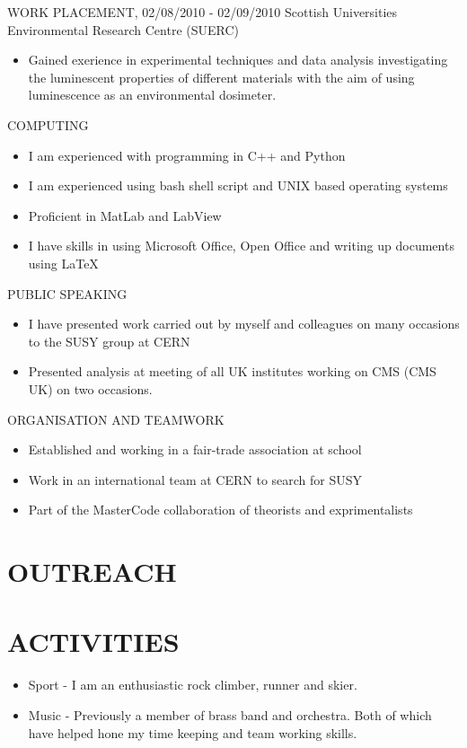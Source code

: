 \documentclass[9pt]{res} %
\begin{document}
\begin{resume}
WORK PLACEMENT, 02/08/2010 - 02/09/2010
\vspace{0.1cm}
Scottish Universities Environmental Research Centre (SUERC)
   \begin{itemize} \itemsep -2pt  %
   \item Gained exerience in experimental techniques and data analysis investigating the luminescent properties of different materials with the aim of using luminescence as an environmental dosimeter.
 \end{itemize}

COMPUTING
\vspace{0.1cm}
 \begin{itemize}
   \item I am experienced with programming in C++ and Python
   \item I am experienced using bash shell script and UNIX based operating systems
   \item Proficient in MatLab and LabView
   \item I have skills in using Microsoft Office, Open Office and writing up documents using LaTeX
 \end{itemize}

PUBLIC SPEAKING
 \begin{itemize}
   \item I have presented work carried out by myself and colleagues on many occasions to the SUSY group at CERN 
   \item Presented analysis at meeting of all UK institutes working on CMS (CMS UK) on two occasions.
 \end{itemize}
\vspace{0.1cm}

ORGANISATION AND TEAMWORK
\vspace{0.1cm}
\begin{itemize}
   \item Established and working in a fair-trade association at school
   \item Work in an international team at CERN to search for SUSY 
   \item Part of the MasterCode collaboration of theorists and exprimentalists
\end{itemize}

\section{OUTREACH}

\section{ACTIVITIES} 
\begin{itemize}
\item Sport - I am an enthusiastic rock climber, runner and skier.
\item Music - Previously a member of brass band and orchestra. Both of which have helped hone my time keeping and team working skills.
\end{itemize}


\end{resume}
\end{document}

